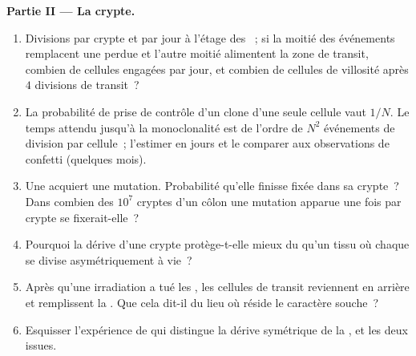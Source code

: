 \begin{problem}
\medskip
\noindent\textbf{Partie II --- La crypte.}
\begin{enumerate}[resume]
  \item Divisions par crypte et par jour à l'étage des ~; si la moitié des événements remplacent une  perdue et l'autre moitié alimentent la zone de transit,
        combien de cellules engagées par jour, et combien de cellules de
        villosité après $4$ divisions de transit~?
  \item La probabilité de prise de contrôle d'un clone d'une seule
        cellule vaut $1/N$. Le temps attendu jusqu'à la monoclonalité est
        de l'ordre de $N^{2}$ événements de division par cellule~;
        l'estimer en jours et le comparer aux observations de confetti
        (quelques mois).
  \item Une  acquiert une mutation. Probabilité qu'elle
        finisse fixée dans sa crypte~? Dans combien des $10^{7}$ cryptes
        d'un côlon une mutation apparue une fois par crypte se
        fixerait-elle~?
  \item Pourquoi la dérive d'une crypte protège-t-elle mieux du 
        qu'un tissu où chaque  se divise asymétriquement à
        vie~?
  \item Après qu'une irradiation a tué les , les
        cellules de transit reviennent en arrière et remplissent la
        . Que cela dit-il du lieu où réside le caractère souche~?
  \item Esquisser l'expérience de  qui distingue la
        dérive symétrique de la , et les deux issues.
\end{enumerate}


\end{problem}
